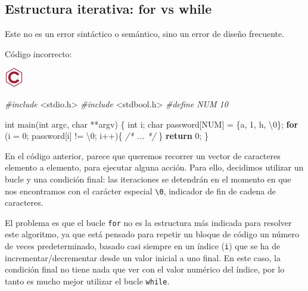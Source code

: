 \documentclass[
]{book}
\newenvironment{Shaded}{\begin{snugshade}}{\end{snugshade}}
\newcommand{\CharTok}[1]{\textcolor[rgb]{0.31,0.60,0.02}{#1}}
\newcommand{\CommentTok}[1]{\textcolor[rgb]{0.56,0.35,0.01}{\textit{#1}}}
\newcommand{\ControlFlowTok}[1]{\textcolor[rgb]{0.13,0.29,0.53}{\textbf{#1}}}
\newcommand{\DataTypeTok}[1]{\textcolor[rgb]{0.13,0.29,0.53}{#1}}
\newcommand{\DecValTok}[1]{\textcolor[rgb]{0.00,0.00,0.81}{#1}}
\newcommand{\ImportTok}[1]{#1}
\newcommand{\NormalTok}[1]{#1}
\newcommand{\PreprocessorTok}[1]{\textcolor[rgb]{0.56,0.35,0.01}{\textit{#1}}}
\begin{document}
\hypertarget{estructura-iterativa-for-vs-while}{%
\subsection{Estructura iterativa: for vs while}\label{estructura-iterativa-for-vs-while}}

Este no es un error sintáctico o semántico, sino un error de diseño frecuente.

Código incorrecto:

\includegraphics{./img/c_err.png}

\begin{Shaded}
\begin{Highlighting}[]
\PreprocessorTok{\#include }\ImportTok{\textless{}stdio.h\textgreater{}}
\PreprocessorTok{\#include }\ImportTok{\textless{}stdbool.h\textgreater{}}
\PreprocessorTok{\#define NUM 10}

\DataTypeTok{int}\NormalTok{ main(}\DataTypeTok{int}\NormalTok{ argc, }\DataTypeTok{char}\NormalTok{ **argv) \{}
    \DataTypeTok{int}\NormalTok{ i;}
    \DataTypeTok{char}\NormalTok{ password[NUM] = \{}\CharTok{\textquotesingle{}a\textquotesingle{}}\NormalTok{, }\CharTok{\textquotesingle{}1\textquotesingle{}}\NormalTok{, }\CharTok{\textquotesingle{}h\textquotesingle{}}\NormalTok{, }\CharTok{\textquotesingle{}\textbackslash{}0\textquotesingle{}}\NormalTok{\};}
    \ControlFlowTok{for}\NormalTok{ (i = }\DecValTok{0}\NormalTok{; password[i] != }\CharTok{\textquotesingle{}\textbackslash{}0\textquotesingle{}}\NormalTok{; i++)\{}
        \CommentTok{/* ... */}
\NormalTok{    \}}
    \ControlFlowTok{return} \DecValTok{0}\NormalTok{;}
\NormalTok{\}}
\end{Highlighting}
\end{Shaded}

En el código anterior, parece que queremos recorrer un vector de caracteres elemento a elemento, para ejecutar alguna acción. Para ello, decidimos utilizar un bucle y una condición final: las iteraciones se detendrán en el momento en que nos encontramos con el carácter especial \texttt{\textquotesingle{}\textbackslash{}0\textquotesingle{}}, indicador de fin de cadena de caracteres.

El problema es que el bucle \texttt{for} no es la estructura más indicada para resolver este algoritmo, ya que está pensado para repetir un bloque de código un número de veces predeterminado, basado casi siempre en un índice (\texttt{i}) que se ha de incrementar/decrementar desde un valor inicial a uno final. En este caso, la condición final no tiene nada que ver con el valor numérico del índice, por lo tanto es mucho mejor utilizar el bucle \texttt{while}.
\end{document}
